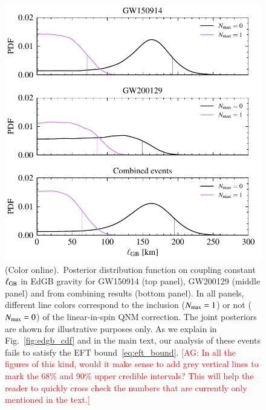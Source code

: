 \documentclass[twocolumn,
               prd,
               aps,
               superscriptaddress,
               tightenlines,
               nofootinbib,
               eqsecnum,
               amsfonts,
               amsmath,
               longbibliography]{revtex4-1}
\newcommand{\agcomm}[1]{{\textcolor{red}{{[AG: #1]}} }}
\begin{document}
\begin{figure}[t]
\includegraphics[width=\columnwidth]{figs/edgb_posteriors_combined.pdf}
\caption{(Color online).~Posterior distribution function on coupling constant $\ell_{\rm GB}$ in EdGB gravity
for GW150914 (top panel), GW200129 (middle panel)
and from combining results (bottom panel).
%
In all panels, different line colors correspond to the inclusion ($N_{\rm max} = 1$) or not ($N_{\rm max} = 0$)
of the linear-in-spin QNM correction.
%
The joint posteriors are shown for illustrative purposes only. As we explain in Fig.~\ref{fig:edgb_cdf} and
in the main text, our analysis of these events fails to satisfy the EFT bound~\eqref{eq:eft_bound}.
\agcomm{In all the figures of this kind, would it make sense to add grey vertical lines to
mark the 68\% and 90\% upper credible intervals? This will help the reader to quickly cross check the numbers
that are currently only mentioned in the text.}}
\label{fig:edgb_exec_sum}
\end{figure}
\end{document}

